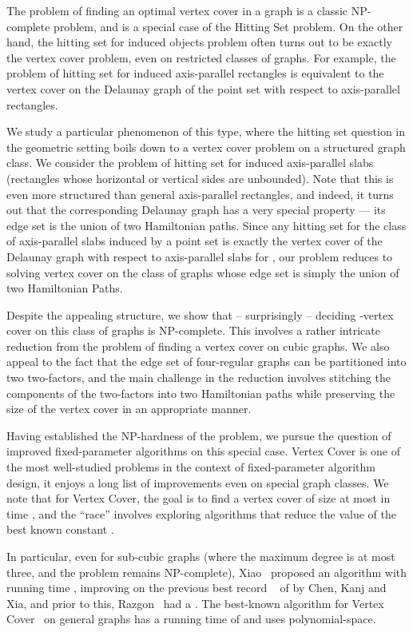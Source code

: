 \documentclass[svgnames]{llncs}
\newcommand{\NPC}{\textrm{\textup{NP-complete}}\xspace}
\begin{document}
The problem of finding an optimal vertex cover in a graph is a classic NP-complete problem, and is a special case of the Hitting Set problem. 
On the other hand, the hitting set for induced objects problem often turns out to be exactly the vertex cover problem, even on
restricted classes of graphs. For example, the problem of hitting set for induced axis-parallel rectangles is equivalent to the vertex cover on the Delaunay graph of the point set with respect to axis-parallel rectangles.

We study a particular phenomenon of this type, where the hitting set question in the geometric setting boils down to a vertex cover problem on a structured graph
class. We consider the problem of hitting set for induced axis-parallel slabs (rectangles whose horizontal or vertical sides are unbounded). Note that
this is even more structured than general axis-parallel rectangles, and indeed, it turns out that the corresponding Delaunay graph has a very special property --- its edge set
is the union of two Hamiltonian paths. Since any hitting set for the class of axis-parallel slabs induced by a point set  is exactly the vertex cover of the Delaunay graph
with respect to axis-parallel slabs for , our problem reduces to solving vertex cover on the class of graphs whose edge set is simply the union of two Hamiltonian Paths.


Despite the appealing structure, we show that -- surprisingly -- deciding  -vertex cover on this class of graphs is \NPC{}. This involves a rather intricate reduction from the problem of
finding a vertex cover on cubic graphs. We also appeal to the fact that the edge set of four-regular graphs can be partitioned into two two-factors, and the main challenge in the
reduction involves stitching the components of the two-factors into two Hamiltonian paths while preserving the size of the vertex cover in an appropriate manner.

Having established the NP-hardness of the problem, we pursue the question of improved fixed-parameter algorithms on this special case. Vertex Cover is one of the most well-studied
problems in the context of fixed-parameter algorithm design, it enjoys a long list of improvements even on special graph classes. We note that for {\sc Vertex Cover}, the
goal is to find a vertex cover of size at most  in time , and the ``race'' involves exploring algorithms that reduce the value of the best known constant .

In particular, even for sub-cubic graphs (where the maximum degree is at most three, and the problem remains \NPC{}), Xiao~\cite{X10} proposed an
algorithm with running time , improving on the previous best record ~\cite{Chen:2005:LST:1108358.1108360} of  by Chen, Kanj and Xia, and prior
to this, Razgon~\cite{R09} had a . The best-known algorithm for Vertex Cover~\cite{CKX10} on general graphs has a running time of  and uses polynomial-space.
\end{document}
